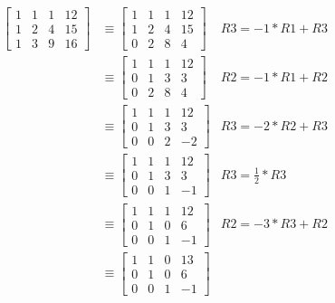 \documentclass{mathhomework}
\begin{document}
\begin{problem}[1.2\#33]
\begin{solution}
        \begin{align*}
            \begin{bmatrix}
                1 & 1 & 1 & 12 \\
                1 & 2 & 4 & 15 \\
                1 & 3 & 9 & 16
            \end{bmatrix}
            & \equiv
            \begin{bmatrix}
                1 & 1 & 1 & 12 \\
                1 & 2 & 4 & 15 \\
                0 & 2 & 8 & 4
            \end{bmatrix}
            & R3 = -1 * R1 + R3 \\ & \equiv
            \begin{bmatrix}
                1 & 1 & 1 & 12 \\
                0 & 1 & 3 & 3 \\
                0 & 2 & 8 & 4
            \end{bmatrix}
            & R2 = -1 * R1 + R2 \\ & \equiv
            \begin{bmatrix}
                1 & 1 & 1 & 12 \\
                0 & 1 & 3 & 3 \\
                0 & 0 & 2 & -2
            \end{bmatrix}
            & R3 = -2 * R2 + R3 \\ & \equiv
            \begin{bmatrix}
                1 & 1 & 1 & 12 \\
                0 & 1 & 3 & 3 \\
                0 & 0 & 1 & -1
            \end{bmatrix}
            & R3 = \frac{1}{2} * R3 \\ & \equiv
            \begin{bmatrix}
                1 & 1 & 1 & 12 \\
                0 & 1 & 0 & 6 \\
                0 & 0 & 1 & -1
            \end{bmatrix}
            & R2 = -3 * R3 + R2 \\ & \equiv
            \begin{bmatrix}
                1 & 1 & 0 & 13 \\
                0 & 1 & 0 & 6 \\
                0 & 0 & 1 & -1

\end{bmatrix}
\end{align*}
\end{solution}
\end{problem}
\end{document}
